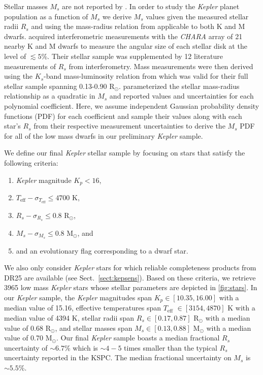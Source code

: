 \documentclass[twocolumn]{emulateapj}
\newcommand{\kepler}[1]{\emph{Kepler}#1}
\newcommand{\teff}[1]{$T_{\text{eff}}$#1}
\begin{document}
Stellar masses $M_s$ are not reported by \cite{berger18}. In order to study the \kepler{} planet population as a function of $M_s$
we derive $M_s$ values given the measured stellar radii $R_s$ and using the mass-radius relation from \cite{boyajian12} 
applicable to both K and M dwarfs.
\cite{boyajian12} acquired interferometric measurements with the \emph{CHARA} array of 21 nearby K and M dwarfs
to measure the angular size of each stellar disk at the level of $\lesssim 5$\%. Their stellar sample was supplemented by 12
literature measurements of $R_s$ from interferometry. Mass measurements were then derived using the $K_s$-band mass-luminosity
relation from \cite{henry93} which was valid for their full stellar sample spanning 0.13-0.90 R$_{\odot}$. \cite{boyajian12}
parameterized the stellar mass-radius relationship as a quadratic in $M_s$ and reported values and uncertainties for each polynomial
coefficient. Here, we assume independent Gaussian probability density functions (PDF) for each coefficient and sample their values
along with each star's $R_s$ from their respective measurement uncertainties to derive the $M_s$ PDF for all of the low mass dwarfs
in our preliminary \kepler{} sample.

We define our final \kepler{} stellar sample by focusing on stars that satisfy the following criteria:

\begin{enumerate}
\item \kepler{} magnitude $K_p < 16$,
\item $T_{\text{eff}} - \sigma_{T_{\text{eff}}} \leq 4700$ K,
\item $R_s - \sigma_{R_s} \leq 0.8$ R$_{\odot}$,
\item $M_s - \sigma_{M_s} \leq 0.8$ M$_{\odot}$, and
\item and an evolutionary flag corresponding to a dwarf star. 
\end{enumerate}

\noindent We also only consider \kepler{} stars for which reliable completeness products from DR25
are available (see Sect.~\ref{sect:kepsens}). Based on these criteria, we retrieve 3965 low mass \kepler{}
stars whose stellar parameters are depicted in \autoref{fig:stars}.
In our \kepler{} sample, the \kepler{} magnitudes span $K_p \in [10.35, 16.00]$ with a median value of 15.16,
effective temperatures span \teff{} $\in [3154, 4870]$ K with a median value of 4394 K,
stellar radii span $R_s \in [0.17, 0.87]$ R$_{\odot}$ with a median value of 0.68 R$_{\odot}$, and
stellar masses span $M_s \in [0.13, 0.88]$ M$_{\odot}$ with a median value of 0.70 M$_{\odot}$.
Our final \kepler{} sample boasts a median fractional $R_s$ uncertainty of $\sim 6.7$\% which is $\sim 4-5$
times smaller than the typical $R_s$ uncertainty reported in the KSPC. The median fractional uncertainty on
$M_s$ is $\sim 5.5$\%.
\end{document}
